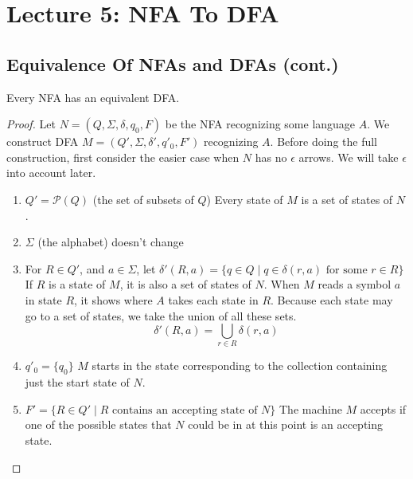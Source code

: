\documentclass[11pt,a4paper]{article}
\begin{document}



\section{Lecture 5: NFA To DFA}
\subsection{Equivalence Of NFAs and DFAs (cont.)}
\begin{theorem}
    Every NFA has an equivalent DFA.

    \begin{proof}
        Let $N=(Q,\Sigma,\delta,q_0, F)$ be the NFA recognizing some language $A$. We construct DFA $M=(Q',\Sigma,\delta',q'_0,F')$ recognizing $A$.
        Before doing the full construction, first consider the easier case when $N$ has no $\epsilon$ arrows. We will take $\epsilon$ into account later.

        \begin{enumerate}
            \item $Q'=\mathcal{P}(Q)$ (the set of subsets of $Q$)
            \subitem Every state of $M$ is a set of states of $N$.
            \item $\Sigma$ (the alphabet) doesn't change
            \item For $R\in Q'$, and $a\in\Sigma$, let $\delta'(R,a)=\{q\in Q\mid q\in\delta(r,a)\text{ for some }r\in R\}$
            \subitem If $R$ is a state of $M$, it is also a set of states of $N$. When $M$ reads a symbol $a$ in state $R$, it shows where $A$ takes each state in $R$. Because each state may go to a set of states, we take the union of all these sets.
            $$\delta'(R,a)=\bigcup\limits_{r\in R}\delta(r,a)$$
            \item $q'_0=\{q_0\}$
            \subitem $M$ starts in the state corresponding to the collection containing just the start state of $N$.
            \item $F'=\{R\in Q'\mid R\text{ contains an accepting state of }N\}$
            \subitem The machine $M$ accepts if one of the possible states that $N$ could be in at this point is an accepting state.
        \end{enumerate}


\end{proof}
\end{theorem}
\end{document}
